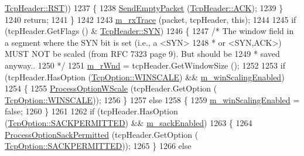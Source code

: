 \begin{DoxyCode}
      \hyperlink{classns3_1_1TcpHeader_a5f3d432941327854b5ad621e467479c6ace24c1738ff6e0ae9348ca913b9d10d8}{TcpHeader::RST}))
1237         \{
1238           \hyperlink{classns3_1_1TcpSocketBase_aa858913c9a4480a14d293f1014905b3e}{SendEmptyPacket} (\hyperlink{classns3_1_1TcpHeader_a5f3d432941327854b5ad621e467479c6a1182e63050402c9f49208c62c1ec2d5c}{TcpHeader::ACK});
1239         \}
1240       \textcolor{keywordflow}{return};
1241     \}
1242 
1243   \hyperlink{classns3_1_1TcpSocketBase_a27b35f098b956baf89388fff0d4e539b}{m\_rxTrace} (packet, tcpHeader, \textcolor{keyword}{this});
1244 
1245   \textcolor{keywordflow}{if} (tcpHeader.GetFlags () & \hyperlink{classns3_1_1TcpHeader_a5f3d432941327854b5ad621e467479c6aa28ef8087c3cb5f3db10d728063b6ac0}{TcpHeader::SYN})
1246     \{
1247       \textcolor{comment}{/* The window field in a segment where the SYN bit is set (i.e., a <SYN>}
1248 \textcolor{comment}{       * or <SYN,ACK>) MUST NOT be scaled (from RFC 7323 page 9). But should be}
1249 \textcolor{comment}{       * saved anyway..}
1250 \textcolor{comment}{       */}
1251       \hyperlink{classns3_1_1TcpSocketBase_af3fafd1671964e0674677be541e1501a}{m\_rWnd} = tcpHeader.GetWindowSize ();
1252 
1253       \textcolor{keywordflow}{if} (tcpHeader.HasOption (\hyperlink{classns3_1_1TcpOption_ab5fef728704d0ef8415899ca6af3efddab982246aeba4e5c8a134da32317b44c0}{TcpOption::WINSCALE}) && 
      \hyperlink{classns3_1_1TcpSocketBase_a80ff21f228d3334f17dcf56f14fa0c7c}{m\_winScalingEnabled})
1254         \{
1255           \hyperlink{classns3_1_1TcpSocketBase_a4674edd220672235e629cb3e3b2a673f}{ProcessOptionWScale} (tcpHeader.GetOption (
      \hyperlink{classns3_1_1TcpOption_ab5fef728704d0ef8415899ca6af3efddab982246aeba4e5c8a134da32317b44c0}{TcpOption::WINSCALE}));
1256         \}
1257       \textcolor{keywordflow}{else}
1258         \{
1259           \hyperlink{classns3_1_1TcpSocketBase_a80ff21f228d3334f17dcf56f14fa0c7c}{m\_winScalingEnabled} = \textcolor{keyword}{false};
1260         \}
1261 
1262       \textcolor{keywordflow}{if} (tcpHeader.HasOption (\hyperlink{classns3_1_1TcpOption_ab5fef728704d0ef8415899ca6af3efddab7c52885f2df3f09365bbb3781261a06}{TcpOption::SACKPERMITTED}) && 
      \hyperlink{classns3_1_1TcpSocketBase_af79c709855a362f331251ef73167209a}{m\_sackEnabled})
1263         \{
1264           \hyperlink{classns3_1_1TcpSocketBase_a9c7dac8b3121549ac801eb0de41801ec}{ProcessOptionSackPermitted} (tcpHeader.GetOption (
      \hyperlink{classns3_1_1TcpOption_ab5fef728704d0ef8415899ca6af3efddab7c52885f2df3f09365bbb3781261a06}{TcpOption::SACKPERMITTED}));
1265         \}
1266       \textcolor{keywordflow}{else}

\end{DoxyCode}
